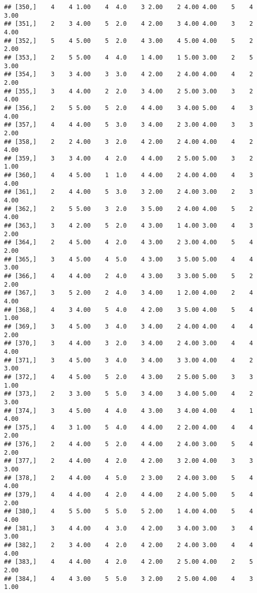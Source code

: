 \documentclass[]{article}
\begin{document}
\begin{verbatim}
## [350,]    4    4 1.00    4  4.0    3 2.00    2 4.00 4.00    5    4 3.00
## [351,]    2    3 4.00    5  2.0    4 2.00    3 4.00 4.00    3    2 4.00
## [352,]    5    4 5.00    5  2.0    4 3.00    4 5.00 4.00    5    2 2.00
## [353,]    2    5 5.00    4  4.0    1 4.00    1 5.00 3.00    2    5 3.00
## [354,]    3    3 4.00    3  3.0    4 2.00    2 4.00 4.00    4    2 2.00
## [355,]    3    4 4.00    2  2.0    3 4.00    2 5.00 3.00    3    2 4.00
## [356,]    2    5 5.00    5  2.0    4 4.00    3 4.00 5.00    4    3 4.00
## [357,]    4    4 4.00    5  3.0    3 4.00    2 3.00 4.00    3    3 2.00
## [358,]    2    2 4.00    3  2.0    4 2.00    2 4.00 4.00    4    2 4.00
## [359,]    3    3 4.00    4  2.0    4 4.00    2 5.00 5.00    3    2 1.00
## [360,]    4    4 5.00    1  1.0    4 4.00    2 4.00 4.00    4    3 4.00
## [361,]    2    4 4.00    5  3.0    3 2.00    2 4.00 3.00    2    3 4.00
## [362,]    2    5 5.00    3  2.0    3 5.00    2 4.00 4.00    5    2 4.00
## [363,]    3    4 2.00    5  2.0    4 3.00    1 4.00 3.00    4    3 2.00
## [364,]    2    4 5.00    4  2.0    4 3.00    2 3.00 4.00    5    4 2.00
## [365,]    3    4 5.00    4  5.0    4 3.00    3 5.00 5.00    4    4 3.00
## [366,]    4    4 4.00    2  4.0    4 3.00    3 3.00 5.00    5    2 2.00
## [367,]    3    5 2.00    2  4.0    3 4.00    1 2.00 4.00    2    4 4.00
## [368,]    4    3 4.00    5  4.0    4 2.00    3 5.00 4.00    5    4 1.00
## [369,]    3    4 5.00    3  4.0    3 4.00    2 4.00 4.00    4    4 2.00
## [370,]    3    4 4.00    3  2.0    3 4.00    2 4.00 3.00    4    4 4.00
## [371,]    3    4 5.00    3  4.0    3 4.00    3 3.00 4.00    4    2 3.00
## [372,]    4    4 5.00    5  2.0    4 3.00    2 5.00 5.00    3    3 1.00
## [373,]    2    3 3.00    5  5.0    3 4.00    3 4.00 5.00    4    2 3.00
## [374,]    3    4 5.00    4  4.0    4 3.00    3 4.00 4.00    4    1 4.00
## [375,]    4    3 1.00    5  4.0    4 4.00    2 2.00 4.00    4    4 2.00
## [376,]    2    4 4.00    5  2.0    4 4.00    2 4.00 3.00    5    4 2.00
## [377,]    2    4 4.00    4  2.0    4 2.00    3 2.00 4.00    3    3 3.00
## [378,]    2    4 4.00    4  5.0    2 3.00    2 4.00 3.00    5    4 4.00
## [379,]    4    4 4.00    4  2.0    4 4.00    2 4.00 5.00    5    4 2.00
## [380,]    4    5 5.00    5  5.0    5 2.00    1 4.00 4.00    5    4 4.00
## [381,]    3    4 4.00    4  3.0    4 2.00    3 4.00 3.00    3    4 3.00
## [382,]    2    3 4.00    4  2.0    4 2.00    2 4.00 3.00    4    4 4.00
## [383,]    4    4 4.00    4  2.0    4 2.00    2 5.00 4.00    2    5 2.00
## [384,]    4    4 3.00    5  5.0    3 2.00    2 5.00 4.00    4    3 1.00

\end{verbatim}
\end{document}
